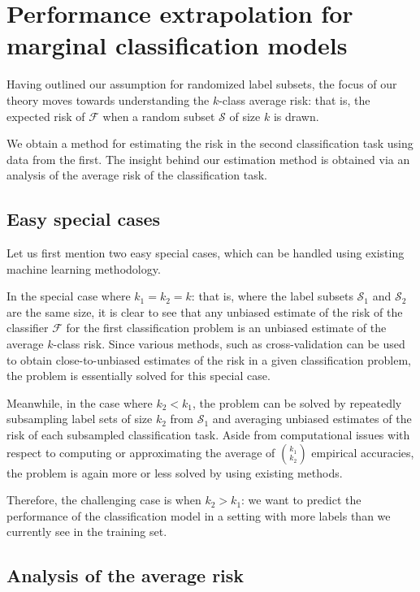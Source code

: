 \documentclass[12pt]{article}
\begin{document}
\section{Performance extrapolation for marginal classification models}

Having outlined our assumption for randomized label subsets, the focus
of our theory moves towards understanding the $k$-class average risk:
that is, the expected risk of $\mathcal{F}$ when a random subset
$\mathcal{S}$ of size $k$ is drawn.

We obtain a method for estimating the risk in the second
classification task using data from the first.  The insight behind our
estimation method is obtained via an analysis of the average risk of
the classification task.

\subsection{Easy special cases}

Let us first mention two easy special cases, which can be handled
using existing machine learning methodology.

In the special case where $k_1 = k_2 = k$: that is, where the label
subsets $\mathcal{S}_1$ and $\mathcal{S}_2$ are the same size, it is
clear to see that any unbiased estimate of the risk of the classifier
$\mathcal{F}$ for the first classification problem is an unbiased
estimate of the average $k$-class risk.  Since various methods, such
as cross-validation can be used to obtain close-to-unbiased estimates
of the risk in a given classification problem, the problem is
essentially solved for this special case.

Meanwhile, in the case where $k_2 < k_1$, the problem can be solved by
repeatedly subsampling label sets of size $k_2$ from $\mathcal{S}_1$
and averaging unbiased estimates of the risk of each subsampled
classification task.  Aside from computational issues with respect to
computing or approximating the average of ${k_1}\choose{k_2}$
empirical accuracies, the problem is again more or less solved by
using existing methods.

Therefore, the challenging case is when $k_2 > k_1$: we want to
predict the performance of the classification model in a setting with
more labels than we currently see in the training set.

\subsection{Analysis of the average risk}
\end{document}
